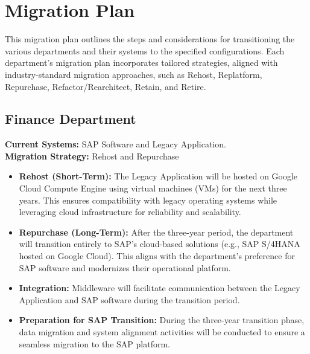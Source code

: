 \section{Migration Plan}

This migration plan outlines the steps and considerations for transitioning the various departments and their systems to the specified configurations. Each department's migration plan incorporates tailored strategies, aligned with industry-standard migration approaches, such as Rehost, Replatform, Repurchase, Refactor/Rearchitect, Retain, and Retire.

\subsection{Finance Department}
\textbf{Current Systems:} SAP Software and Legacy Application. \\
\textbf{Migration Strategy:} Rehost and Repurchase
\begin{itemize}
    \item \textbf{Rehost (Short-Term):} The Legacy Application will be hosted on Google Cloud Compute Engine using virtual machines (VMs) for the next three years. This ensures compatibility with legacy operating systems while leveraging cloud infrastructure for reliability and scalability.
    \item \textbf{Repurchase (Long-Term):} After the three-year period, the department will transition entirely to SAP's cloud-based solutions (e.g., SAP S/4HANA hosted on Google Cloud). This aligns with the department's preference for SAP software and modernizes their operational platform.
    \item \textbf{Integration:} Middleware will facilitate communication between the Legacy Application and SAP software during the transition period.
    \item \textbf{Preparation for SAP Transition:} During the three-year transition phase, data migration and system alignment activities will be conducted to ensure a seamless migration to the SAP platform.
\end{itemize}


